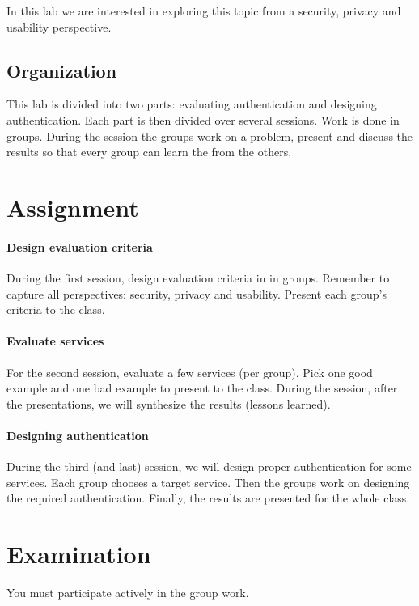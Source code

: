 In this lab we are interested in exploring this topic from a security, privacy 
and usability perspective.

\subsection{Organization}

This lab is divided into two parts: evaluating authentication and designing 
authentication.
Each part is then divided over several sessions.
Work is done in groups.
During the session the groups work on a problem, present and discuss the 
results so that every group can learn the from the others.


\section{Assignment}

\paragraph{Design evaluation criteria}

During the first session, design evaluation criteria in in groups.
Remember to capture all perspectives: security, privacy and usability.
Present each group's criteria to the class.

\paragraph{Evaluate services}

For the second session, evaluate a few services (per group).
Pick one good example and one bad example to present to the class.
During the session, after the presentations, we will synthesize the results 
(lessons learned).

\paragraph{Designing authentication}

During the third (and last) session, we will design proper authentication for 
some services.
Each group chooses a target service.
Then the groups work on designing the required authentication.
Finally, the results are presented for the whole class.


\section{Examination}

You must participate actively in the group work.



\begin{frame}[allowframebreaks]
  \printbibliography
\end{frame}
